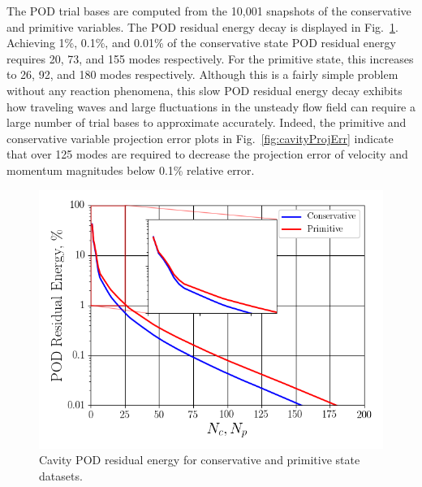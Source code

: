 The POD trial bases are computed from the 10,001 snapshots of the conservative and primitive variables. The POD residual energy decay is displayed in Fig.~\ref{fig:cavityPODEnergy}. Achieving 1\%, 0.1\%, and 0.01\% of the conservative state POD residual energy requires 20, 73, and 155 modes respectively. For the primitive state, this increases to 26, 92, and 180 modes respectively. Although this is a fairly simple problem without any reaction phenomena, this slow POD residual energy decay exhibits how traveling waves and large fluctuations in the unsteady flow field can require a large number of trial bases to approximate accurately. Indeed, the primitive and conservative variable projection error plots in Fig.~\ref{fig:cavityProjErr} indicate that over 125 modes are required to decrease the projection error of velocity and momentum magnitudes below 0.1\% relative error.

\begin{figure}
	\centering
	\includegraphics[width=0.75\linewidth]{Chapters/CavityAndCVRC/Images/cavity/cavity_pod_energy_10ms.png}
	\caption{\label{fig:cavityPODEnergy}Cavity POD residual energy for conservative and primitive state datasets.}
\end{figure}

